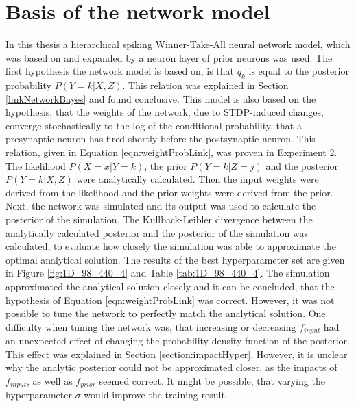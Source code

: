 \section{Basis of the network model}
\label{basisOfModel}
In this thesis a hierarchical spiking Winner-Take-All neural network model, which was based on \citet{nessler} and expanded by a neuron layer of prior neurons was used. The first hypothesis the network model is based on, is that $q_k$ is equal to the posterior probability $P(Y = k|X, Z)$. This relation was explained in Section \ref{linkNetworkBayes} and found conclusive. This model is also based on the hypothesis, that the weights of the network, due to STDP-induced changes, converge stochastically to the log of the conditional probability, that a presynaptic neuron has fired shortly before the postsynaptic neuron. This relation, given in Equation \ref{eqn:weightProbLink}, was proven in Experiment 2. The likelihood $P(X=x|Y=k)$, the prior $P(Y=k|Z=j)$ and the posterior $P(Y = k|X, Z)$ were analytically calculated. Then the input weights were derived from the likelihood and the prior weights were derived from the prior. Next, the network was simulated and its output was used to calculate the posterior of the simulation. The Kullback-Leibler divergence between the analytically calculated posterior and the posterior of the simulation was calculated, to evaluate how closely the simulation was able to approximate the optimal analytical solution. The results of the best hyperparameter set are given in Figure \ref{fig:1D_98_440_4} and Table \ref{tab:1D_98_440_4}. The simulation approximated the analytical solution closely and it can be concluded, that the hypothesis of Equation \ref{eqn:weightProbLink} was correct. However, it was not possible to tune the network to perfectly match the analytical solution. One difficulty when tuning the network was, that increasing or decreasing $f_{input}$ had an unexpected effect of changing the probability density function of the posterior. This effect was explained in Section \ref{section:impactHyper}. However, it is unclear why the analytic posterior could not be approximated closer, as the impacts of $f_{input}$, as well as $f_{prior}$ seemed correct. It might be possible, that varying the hyperparameter $\sigma$ would improve the training result.

